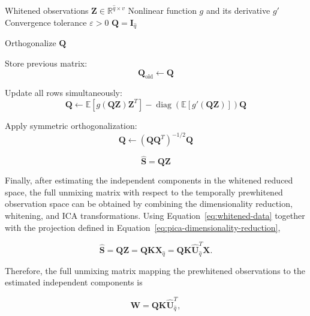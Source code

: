 \documentclass[english]{pwr_wmat_praca_dyplomowa}
\theoremstyle{definition}
\theoremstyle{remark}
\begin{document}
\begin{algorithm}[H]
\caption{Symmetric FastICA}
\label{alg:fastica}
\begin{algorithmic}[1]
    \Require Whitened observations $\mathbf{Z} \in \mathbb{R}^{\widehat{q}\times v}$
    \Require Nonlinear function $g$ and its derivative $g'$
    \Require Convergence tolerance $\varepsilon > 0$
    \Require $\mathbf{Q} = \mathbf{I}_{\widehat{q}}$

    \State Orthogonalize $\mathbf{Q}$

    \Repeat
        \State Store previous matrix:
        $$ \mathbf{Q}_{\mathrm{old}} \gets \mathbf{Q} $$

        \State Update all rows simultaneously:
        $$ 
        \mathbf{Q} \gets 
        \mathbb{E} \left[ g(\mathbf{Q}\mathbf{Z})\mathbf{Z}^T \right] 
        - \operatorname{diag} \left( \mathbb{E} \left[ g'(\mathbf{Q}\mathbf{Z}) \right] \right) \mathbf{Q}
        $$

        \State Apply symmetric orthogonalization:
        $$ \mathbf{Q} \gets (\mathbf{Q}\mathbf{Q}^T)^{-1/2}\mathbf{Q} $$


    \State \Return
    $$ \widehat{\mathbf{S}} = \mathbf{Q} \mathbf{Z} $$
\end{algorithmic}
\end{algorithm}

Finally, after estimating the independent components in the whitened reduced space, the full unmixing matrix with respect to the temporally prewhitened observation space can be obtained by combining the dimensionality reduction, whitening, and ICA transformations. Using Equation~\eqref{eq:whitened-data} together with the projection defined in Equation~\eqref{eq:pica-dimensionality-reduction},

\begin{equation}
    \widehat{\mathbf{S}} = \mathbf{Q}\mathbf{Z} = \mathbf{Q}\mathbf{K}\mathbf{X}_{\widehat{q}} = \mathbf{Q}\mathbf{K}\widehat{\mathbf{U}}_{\widehat{q}}^T \mathbf{X}.
\end{equation}

Therefore, the full unmixing matrix mapping the prewhitened observations to the estimated independent components is

\begin{equation}
    \mathbf{W} = \mathbf{Q}\mathbf{K}\widehat{\mathbf{U}}_{\widehat{q}}^T,
\end{equation}
\end{document}
